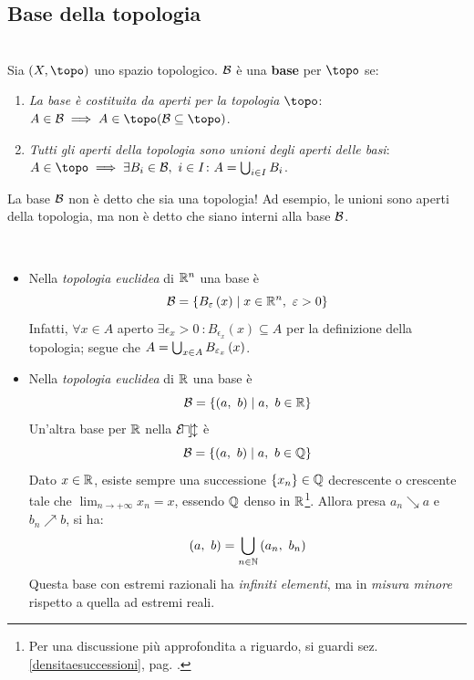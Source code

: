 \subsection{Base della topologia}
\begin{define}[Base.]~{}\\
Sia $\left(X, \topo\right)$ uno spazio topologico. $\mathcal{B}$ è una \textbf{base} per $\topo$ se:
\begin{enumerate}
\item \textit{La base è costituita da aperti per la topologia $\topo$}: $A\in\basis\implies A\in\topo (\basis\subseteq\topo)$.
\item \textit{Tutti gli aperti della topologia sono unioni degli aperti delle basi}:
$A\in\topo\implies\exists B_i\in\basis,\ i\in I\colon A=\union_{i\in I}B_i$.
\end{enumerate}
\vspace{-3mm}
\end{define}
\begin{attention}
La base $\mathcal{B}$ non è detto che sia una topologia! Ad esempio, le unioni sono aperti della topologia, ma non è detto che siano interni alla base $\mathcal{B}$.
\end{attention}
\begin{examples}~{}
\begin{itemize}
\item Nella \textit{topologia euclidea} di $\mathbb{R}^n$ una base è
\begin{equation}
\mathcal{B}=\left\{B_{\varepsilon}\left(x\right)\mid x\in\mathbb{R}^n,\ \varepsilon>0\right\}
\end{equation}
Infatti, $\forall x\in A$ aperto $\exists\epsilon_x>0\ \colon B_{\epsilon_x}\left(x\right)\subseteq A$ per la definizione della topologia; segue che $A=\mathop{{\bigcup}}\displaylimits_{x\in A}B_{\varepsilon_x}\left(x\right)$.
\item Nella \textit{topologia euclidea} di $\mathbb{R}$ una base è
\begin{equation}
	\mathcal{B}=\left\{\left(a,\ b\right)\mid a,\ b\in \mathbb{R}\right\}
\end{equation}
Un'altra base per $\mathbb{R}$ nella $\mathcal{E\! u\! c\! l}$ è 
\begin{equation*}
	\mathcal{B}=\left\{\left(a,\ b\right)\mid a,\ b\in \mathbb{Q}\right\}
\end{equation*}
Dato $x\in\mathbb{R}$, esiste sempre una successione $\left\{x_n\right\}\in\mathbb{Q}$ decrescente o crescente tale che $\displaystyle\lim_{n \to +\infty}x_n=x$, essendo $\mathbb{Q}$ denso in $\mathbb{R}$\footnote{Per una discussione più approfondita a riguardo, si guardi sez. \ref{densitaesuccessioni}, pag. \pageref{densitaesuccessioni}.}. Allora presa $a_n\searrow a$ e $b_n\nearrow b$, si ha:
\begin{equation*}
\left(a,\ b\right)=\mathop{{\bigcup}}\displaylimits_{n\in \mathbb{N}}\left(a_n,\ b_n\right)
\end{equation*}
Questa base con estremi razionali ha \textit{infiniti elementi}, ma in \textit{misura minore} rispetto a quella ad estremi reali.
\end{itemize}
\vspace{-3mm}
\end{examples}

